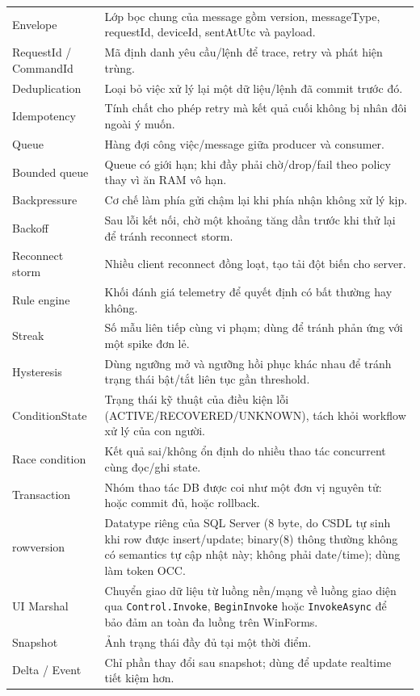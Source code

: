 \begin{longtable}{p{3.4cm} p{11.2cm}}
Envelope & Lớp bọc chung của message gồm version, messageType, requestId, deviceId, sentAtUtc và payload. \\
RequestId / CommandId & Mã định danh yêu cầu/lệnh để trace, retry và phát hiện trùng. \\
Deduplication & Loại bỏ việc xử lý lại một dữ liệu/lệnh đã commit trước đó. \\
Idempotency & Tính chất cho phép retry mà kết quả cuối không bị nhân đôi ngoài ý muốn. \\
Queue & Hàng đợi công việc/message giữa producer và consumer. \\
Bounded queue & Queue có giới hạn; khi đầy phải chờ/drop/fail theo policy thay vì ăn RAM vô hạn. \\
Backpressure & Cơ chế làm phía gửi chậm lại khi phía nhận không xử lý kịp. \\
Backoff & Sau lỗi kết nối, chờ một khoảng tăng dần trước khi thử lại để tránh reconnect storm. \\
Reconnect storm & Nhiều client reconnect đồng loạt, tạo tải đột biến cho server. \\
Rule engine & Khối đánh giá telemetry để quyết định có bất thường hay không. \\
Streak & Số mẫu liên tiếp cùng vi phạm; dùng để tránh phản ứng với một spike đơn lẻ. \\
Hysteresis & Dùng ngưỡng mở và ngưỡng hồi phục khác nhau để tránh trạng thái bật/tắt liên tục gần threshold. \\
ConditionState & Trạng thái kỹ thuật của điều kiện lỗi (ACTIVE/RECOVERED/UNKNOWN), tách khỏi workflow xử lý của con người. \\
Race condition & Kết quả sai/không ổn định do nhiều thao tác concurrent cùng đọc/ghi state. \\
Transaction & Nhóm thao tác DB được coi như một đơn vị nguyên tử: hoặc commit đủ, hoặc rollback. \\
rowversion & Datatype riêng của SQL Server (8 byte, do CSDL tự sinh khi row được insert/update; binary(8) thông thường không có semantics tự cập nhật này; không phải date/time); dùng làm token OCC. \\
UI Marshal & Chuyển giao dữ liệu từ luồng nền/mạng về luồng giao diện qua \texttt{Control.Invoke}, \texttt{BeginInvoke} hoặc \texttt{InvokeAsync} để bảo đảm an toàn đa luồng trên WinForms. \\
Snapshot & Ảnh trạng thái đầy đủ tại một thời điểm. \\
Delta / Event & Chỉ phần thay đổi sau snapshot; dùng để update realtime tiết kiệm hơn. \\

\end{longtable}
